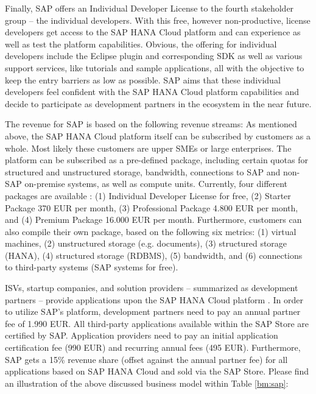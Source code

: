 Finally, SAP offers an Individual Developer License to the fourth stakeholder group -- the individual developers. With this free, however non-productive, license developers get access to the SAP HANA Cloud platform and can experience as well as test the platform capabilities. Obvious, the offering for individual developers include the Eclipse plugin and corresponding \ac{SDK} as well as various support services, like tutorials and sample applications, all with the objective to keep the entry barriers as low as possible. SAP aims that these individual developers feel confident with the SAP HANA Cloud platform capabilities and decide to participate as development partners in the ecosystem in the near future.

The revenue for SAP is based on the following revenue streams: As mentioned above, the SAP HANA Cloud platform itself can be subscribed by customers as a whole. Most likely these customers are upper \acp{SME} or large enterprises. The platform can be subscribed as a pre-defined package, including certain quotas for structured and unstructured storage, bandwidth, connections to SAP and non-SAP on-premise systems, as well as compute units. Currently, four different packages are available \citep{SAP2013b}: (1) Individual Developer License for free, (2) Starter Package 370 \ac{EUR} per month, (3) Professional Package 4.800 \ac{EUR} per month, and (4) Premium Package 16.000 \ac{EUR} per month. Furthermore, customers can also compile their own package, based on the following six metrics: (1) virtual machines, (2) unstructured storage (e.g. documents), (3) structured storage (HANA), (4) structured storage (\ac{RDBMS}), (5) bandwidth, and (6) connections to third-party systems (SAP systems for free). 

\acp{ISV}, startup companies, and solution providers -- summarized as development partners -- provide applications upon the SAP HANA Cloud platform \citep{SAP2013a}. In order to utilize SAP's platform, development partners need to pay an annual partner fee of 1.990 \ac{EUR}. All third-party applications available within the SAP Store are certified by SAP. Application providers need to pay an initial application certification fee (990 \ac{EUR}) and recurring annual fees (495 \ac{EUR}). Furthermore, SAP gets a 15\% revenue share (offset against the annual partner fee) for all applications based on SAP HANA Cloud and sold via the SAP Store. Please find an illustration of the above discussed business model within Table \ref{bm:sap}:



